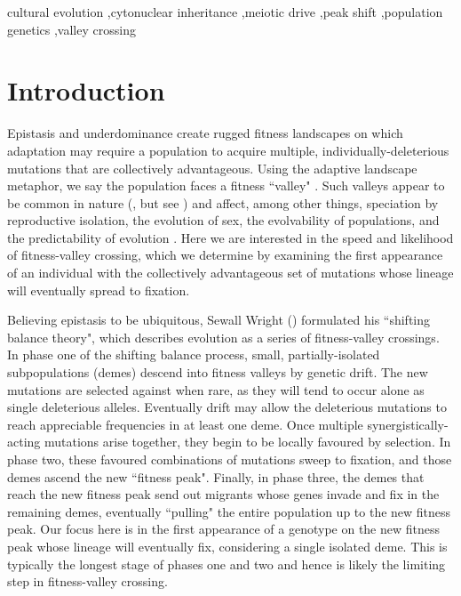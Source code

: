 \documentclass[review,3p,authoryear]{elsarticle}
\begin{document}
\begin{keyword}
cultural evolution \sep cytonuclear inheritance \sep meiotic drive \sep peak shift \sep population genetics \sep valley crossing
\end{keyword}

\maketitle

\section{Introduction}

Epistasis and underdominance create rugged fitness landscapes on which adaptation may require a population to acquire multiple, individually-deleterious mutations that are collectively advantageous.
Using the adaptive landscape metaphor, we say the population faces a fitness ``valley" \citep{Wright1932}.
Such valleys appear to be common in nature (\citealp{Weinreich2005a,Szendro2013}, but see \citealp{Carneiro2010}) and affect, among other things, speciation by reproductive isolation, the evolution of sex, the evolvability of populations, and the predictability of evolution \citep{Szendro2013}.
Here we are interested in the speed and likelihood of fitness-valley crossing, which we determine by examining the first appearance of an individual with the collectively advantageous set of mutations whose lineage will eventually spread to fixation.

Believing epistasis to be ubiquitous, Sewall Wright (\citeyear{Wright1931,Wright1932}) formulated his ``shifting balance theory", which describes evolution as a series of fitness-valley crossings.
In phase one of the shifting balance process, small, partially-isolated subpopulations (demes) descend into fitness valleys by genetic drift.
The new mutations are selected against when rare, as they will tend to occur alone as single deleterious alleles.
Eventually drift may allow the deleterious mutations to reach appreciable frequencies in at least one deme. 
Once multiple synergistically-acting mutations arise together, they begin to be locally favoured by selection.
In phase two, these favoured combinations of mutations sweep to fixation, and those demes ascend the new ``fitness peak". 
Finally, in phase three, the demes that reach the new fitness peak send out migrants whose genes invade and fix in the remaining demes, eventually ``pulling" the entire population up to the new fitness peak.
Our focus here is in the first appearance of a genotype on the new fitness peak whose lineage will eventually fix, considering a single isolated deme.
This is typically the longest stage of phases one and two \citep{Stephan1996} and hence is likely the limiting step in fitness-valley crossing.
\end{document}
